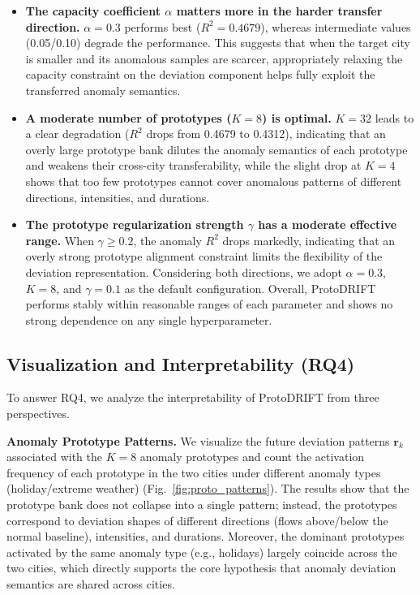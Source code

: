 \begin{itemize}
    \item \textbf{The capacity coefficient $\alpha$ matters more in the harder transfer direction.} $\alpha=0.3$ performs best ($R^2=0.4679$), whereas intermediate values (0.05/0.10) degrade the performance. This suggests that when the target city is smaller and its anomalous samples are scarcer, appropriately relaxing the capacity constraint on the deviation component helps fully exploit the transferred anomaly semantics.
    \item \textbf{A moderate number of prototypes ($K=8$) is optimal.} $K=32$ leads to a clear degradation ($R^2$ drops from 0.4679 to 0.4312), indicating that an overly large prototype bank dilutes the anomaly semantics of each prototype and weakens their cross-city transferability, while the slight drop at $K=4$ shows that too few prototypes cannot cover anomalous patterns of different directions, intensities, and durations.
    \item \textbf{The prototype regularization strength $\gamma$ has a moderate effective range.} When $\gamma \geq 0.2$, the anomaly $R^2$ drops markedly, indicating that an overly strong prototype alignment constraint limits the flexibility of the deviation representation. Considering both directions, we adopt $\alpha=0.3$, $K=8$, and $\gamma=0.1$ as the default configuration. Overall, ProtoDRIFT performs stably within reasonable ranges of each parameter and shows no strong dependence on any single hyperparameter.
\end{itemize}

\subsection{Visualization and Interpretability (RQ4)}

To answer RQ4, we analyze the interpretability of ProtoDRIFT from three perspectives.

\textbf{Anomaly Prototype Patterns.} We visualize the future deviation patterns $\mathbf{r}_k$ associated with the $K=8$ anomaly prototypes and count the activation frequency of each prototype in the two cities under different anomaly types (holiday/extreme weather) (Fig.~\ref{fig:proto_patterns}). The results show that the prototype bank does not collapse into a single pattern; instead, the prototypes correspond to deviation shapes of different directions (flows above/below the normal baseline), intensities, and durations. Moreover, the dominant prototypes activated by the same anomaly type (e.g., holidays) largely coincide across the two cities, which directly supports the core hypothesis that anomaly deviation semantics are shared across cities.

